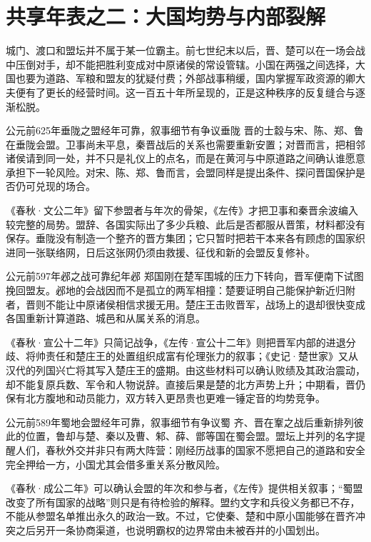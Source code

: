 \section{共享年表之二：大国均势与内部裂解}

城门、渡口和盟坛并不属于某一位霸主。前七世纪末以后，晋、楚可以在一场会战中压倒对手，却不能把胜利变成对中原诸侯的常设管辖。小国在两强之间选择，大国也要为道路、军粮和盟友的犹疑付费；外部战事稍缓，国内掌握军政资源的卿大夫便有了更长的经营时间。这一百五十年所呈现的，正是这种秩序的反复缝合与逐渐松脱。

\begin{event}{公元前625年}{垂陇之盟}{经年可靠，叙事细节有争议}{垂陇}
晋的士縠与宋、陈、郑、鲁在垂陇会盟。卫事尚未平息，秦晋战后的关系也需要重新安置；对晋而言，把相邻诸侯请到同一处，并不只是礼仪上的点名，而是在黄河与中原道路之间确认谁愿意承担下一轮风险。对宋、陈、郑、鲁而言，会盟同样是提出条件、探问晋国保护是否仍可兑现的场合。

《春秋·文公二年》留下参盟者与年次的骨架，《左传》才把卫事和秦晋余波编入较完整的局势。盟辞、各国实际出了多少兵粮、此后是否都服从晋策，材料都没有保存。垂陇没有制造一个整齐的晋方集团；它只暂时把若干本来各有顾虑的国家织进同一张联络网，日后这张网仍须由救援、征伐和新的会盟反复修补。
\end{event}

\begin{event}{公元前597年}{邲之战}{可靠纪年}{邲}
郑国刚在楚军围城的压力下转向，晋军便南下试图挽回盟友。邲地的会战因而不是孤立的两军相撞：楚要证明自己能保护新近归附者，晋则不能让中原诸侯相信求援无用。楚庄王击败晋军，战场上的退却很快变成各国重新计算道路、城邑和从属关系的消息。

《春秋·宣公十二年》只简记战争，《左传·宣公十二年》则把晋军内部的进退分歧、将帅责任和楚庄王的处置组织成富有伦理张力的叙事；《史记·楚世家》又从汉代的列国兴亡将其写入楚庄王的盛期。由这些材料可以确认败绩及其政治震动，却不能复原兵数、军令和人物说辞。直接后果是楚的北方声势上升；中期看，晋仍保有北方腹地和动员能力，双方转入更昂贵也更难一锤定音的均势竞争。
\end{event}

\begin{event}{公元前589年}{蜀地会盟}{经年可靠，叙事细节有争议}{蜀}
齐、晋在鞌之战后重新排列彼此的位置，鲁却与楚、秦以及曹、邾、薛、鄫等国在蜀会盟。盟坛上并列的名字提醒人们，春秋外交并非只有两大阵营：刚经历战事的国家不愿把自己的道路和安全完全押给一方，小国尤其会借多重关系分散风险。

《春秋·成公二年》可以确认会盟的年次和参与者，《左传》提供相关叙事；“蜀盟改变了所有国家的战略”则只是有待检验的解释。盟约文字和兵役义务都已不存，不能从参盟名单推出永久的政治一致。不过，它使秦、楚和中原小国能够在晋齐冲突之后另开一条协商渠道，也说明霸权的边界常由未被吞并的小国划出。
\end{event}

